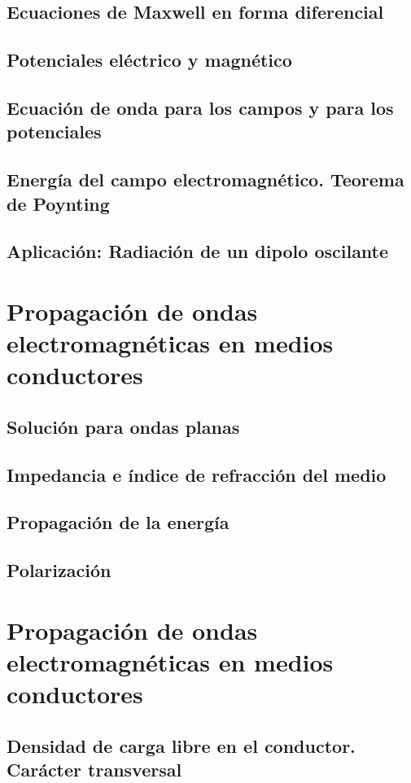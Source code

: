 \documentclass[a4paper]{book}
\begin{document}
\section{Ecuaciones de Maxwell en forma diferencial}
\section{Potenciales eléctrico y magnético}
\section{Ecuación de onda para los campos y para los potenciales}
\section{Energía del campo electromagnético. Teorema de Poynting}
\section{Aplicación: Radiación de un dipolo oscilante}

\chapter{Propagación de ondas electromagnéticas en medios conductores}
\section{Solución para ondas planas}
\section{Impedancia e índice de refracción del medio}
\section{Propagación de la energía}
\section{Polarización}

\chapter{Propagación de ondas electromagnéticas en medios conductores}
\section{Densidad de carga libre en el conductor. Carácter transversal}
\end{document}
